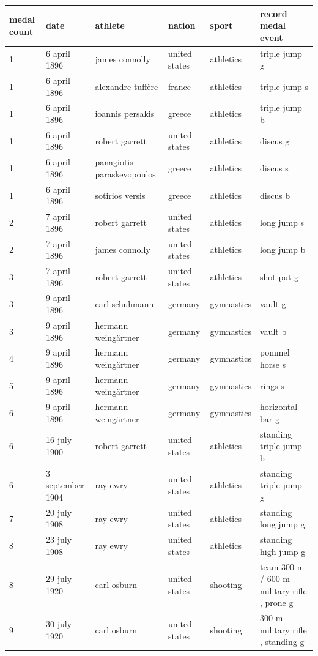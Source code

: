\documentclass{article}
\begin{document}
\begin{tabular}{llllll}
\toprule
medal count & date & athlete & nation & sport & record medal event \\
\midrule
1 & 6 april 1896 & james connolly & united states & athletics & triple jump g \\
1 & 6 april 1896 & alexandre tuffère & france & athletics & triple jump s \\
1 & 6 april 1896 & ioannis persakis & greece & athletics & triple jump b \\
1 & 6 april 1896 & robert garrett & united states & athletics & discus g \\
1 & 6 april 1896 & panagiotis paraskevopoulos & greece & athletics & discus s \\
1 & 6 april 1896 & sotirios versis & greece & athletics & discus b \\
2 & 7 april 1896 & robert garrett & united states & athletics & long jump s \\
2 & 7 april 1896 & james connolly & united states & athletics & long jump b \\
3 & 7 april 1896 & robert garrett & united states & athletics & shot put g \\
3 & 9 april 1896 & carl schuhmann & germany & gymnastics & vault g \\
3 & 9 april 1896 & hermann weingärtner & germany & gymnastics & vault b \\
4 & 9 april 1896 & hermann weingärtner & germany & gymnastics & pommel horse s \\
5 & 9 april 1896 & hermann weingärtner & germany & gymnastics & rings s \\
6 & 9 april 1896 & hermann weingärtner & germany & gymnastics & horizontal bar g \\
6 & 16 july 1900 & robert garrett & united states & athletics & standing triple jump b \\
6 & 3 september 1904 & ray ewry & united states & athletics & standing triple jump g \\
7 & 20 july 1908 & ray ewry & united states & athletics & standing long jump g \\
8 & 23 july 1908 & ray ewry & united states & athletics & standing high jump g \\
8 & 29 july 1920 & carl osburn & united states & shooting & team 300 m / 600 m military rifle , prone g \\
9 & 30 july 1920 & carl osburn & united states & shooting & 300 m military rifle , standing g \\

\end{tabular}
\end{document}
